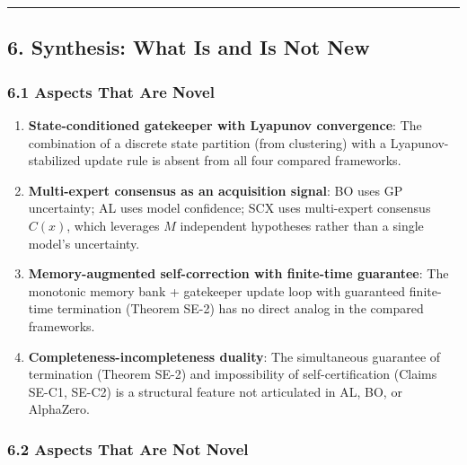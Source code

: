 \documentclass[
  12pt,
]{ctexart}
\begin{document}
\begin{center}\rule{0.5\linewidth}{0.5pt}\end{center}

\subsection{6. Synthesis: What Is and Is Not
New}\label{synthesis-what-is-and-is-not-new}

\subsubsection{6.1 Aspects That Are Novel}\label{aspects-that-are-novel}

\begin{enumerate}
\def\labelenumi{\arabic{enumi}.}
\item
  \textbf{State-conditioned gatekeeper with Lyapunov convergence}: The
  combination of a discrete state partition (from clustering) with a
  Lyapunov-stabilized update rule is absent from all four compared
  frameworks.
\item
  \textbf{Multi-expert consensus as an acquisition signal}: BO uses GP
  uncertainty; AL uses model confidence; SCX uses multi-expert consensus
  \(C(x)\), which leverages \(M\) independent hypotheses rather than a
  single model's uncertainty.
\item
  \textbf{Memory-augmented self-correction with finite-time guarantee}:
  The monotonic memory bank + gatekeeper update loop with guaranteed
  finite-time termination (Theorem SE-2) has no direct analog in the
  compared frameworks.
\item
  \textbf{Completeness-incompleteness duality}: The simultaneous
  guarantee of termination (Theorem SE-2) and impossibility of
  self-certification (Claims SE-C1, SE-C2) is a structural feature not
  articulated in AL, BO, or AlphaZero.
\end{enumerate}

\subsubsection{6.2 Aspects That Are Not
Novel}\label{aspects-that-are-not-novel}
\end{document}
